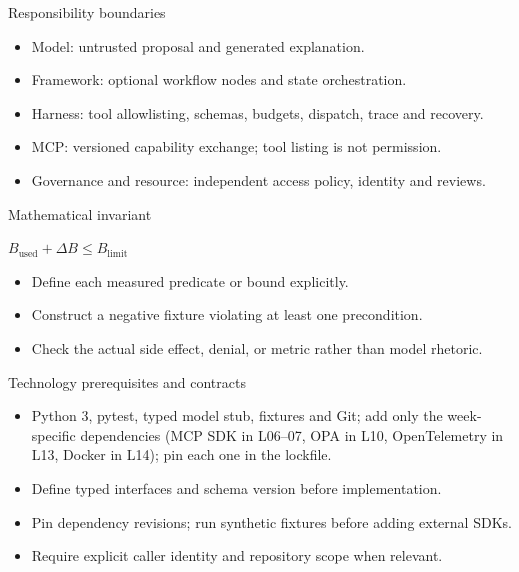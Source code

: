 \documentclass[aspectratio=169,10pt]{beamer}
\begin{document}
\begin{frame}{Responsibility boundaries}
\small
\begin{itemize}
\item Model: untrusted proposal and generated explanation.
\item Framework: optional workflow nodes and state orchestration.
\item Harness: tool allowlisting, schemas, budgets, dispatch, trace and recovery.
\item MCP: versioned capability exchange; tool listing is not permission.
\item Governance and resource: independent access policy, identity and reviews.
\end{itemize}

\end{frame}

\begin{frame}{Mathematical invariant}
\small
\begin{center}\Large $B_{\mathrm{used}}+\Delta B\leq B_{\mathrm{limit}}$\end{center}
\begin{itemize}
\item Define each measured predicate or bound explicitly.
\item Construct a negative fixture violating at least one precondition.
\item Check the actual side effect, denial, or metric rather than model rhetoric.
\end{itemize}

\end{frame}

\begin{frame}{Technology prerequisites and contracts}
\small
\begin{itemize}
\item Python 3, pytest, typed model stub, fixtures and Git; add only the week-specific dependencies (MCP SDK in L06--07, OPA in L10, OpenTelemetry in L13, Docker in L14); pin each one in the lockfile.
\item Define typed interfaces and schema version before implementation.
\item Pin dependency revisions; run synthetic fixtures before adding external SDKs.
\item Require explicit caller identity and repository scope when relevant.
\end{itemize}

\end{frame}
\end{document}
